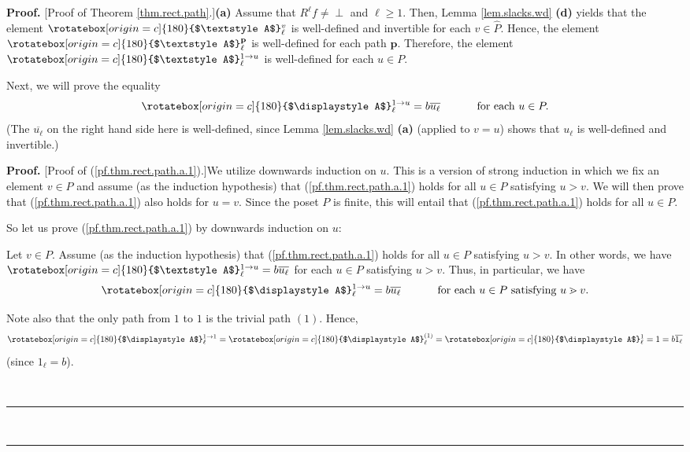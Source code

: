 \documentclass[numbers=enddot,12pt,final,onecolumn,notitlepage]{scrartcl}%
\theoremstyle{definition}
\newenvironment{verlong}{}{}
\newcommand{\undf}{\operatorname*{\bot}}
\newcommand{\upslack}{\mathchoice{\rotatebox[origin=c]{180}{$\displaystyle A$}}{\rotatebox[origin=c]{180}{$\textstyle A$}}{\rotatebox[origin=c]{180}{$\scriptstyle A$}}{\rotatebox[origin=c]{180}{$\scriptscriptstyle A$}}}
\newenvironment{proof}[1][Proof]{\noindent\textbf{#1.} }{\ \rule{0.5em}{0.5em}}
\begin{document}
\begin{proof}
[Proof of Theorem \ref{thm.rect.path}.]\textbf{(a)} Assume that $R^{\ell}%
f\neq\undf$ and $\ell\geq1$. Then, Lemma \ref{lem.slacks.wd} \textbf{(d)}
yields that the element $\upslack_{\ell}^{v}$ is well-defined and invertible
for each $v\in\widehat{P}$. Hence, the element $\upslack_{\ell}^{\mathbf{p}}$
is well-defined for each path $\mathbf{p}$. Therefore, the element
$\upslack_{\ell}^{1\rightarrow u}$ is well-defined for each $u\in P$.

Next, we will prove the equality
\begin{equation}
\upslack_{\ell}^{1\rightarrow u}=b\overline{u_{\ell}}%
\ \ \ \ \ \ \ \ \ \ \text{for each }u\in P. \label{pf.thm.rect.path.a.1}%
\end{equation}
(The $\overline{u_{\ell}}$ on the right hand side here is well-defined, since
Lemma \ref{lem.slacks.wd} \textbf{(a)} (applied to $v=u$) shows that $u_{\ell
}$ is well-defined and invertible.)

\begin{proof}
[Proof of (\ref{pf.thm.rect.path.a.1}).]We utilize downwards induction on $u$.
This is a version of strong induction in which we fix an element $v\in P$ and
assume (as the induction hypothesis) that (\ref{pf.thm.rect.path.a.1}) holds
for all $u\in P$ satisfying $u>v$. We will then prove that
(\ref{pf.thm.rect.path.a.1}) also holds for $u=v$. Since the poset $P$ is
finite, this will entail that (\ref{pf.thm.rect.path.a.1}) holds for all $u\in
P$.

\begin{verlong}
So let us prove (\ref{pf.thm.rect.path.a.1}) by downwards induction on $u$:
\end{verlong}

Let $v\in P$. Assume (as the induction hypothesis) that
(\ref{pf.thm.rect.path.a.1}) holds for all $u\in P$ satisfying $u>v$. In other
words, we have $\upslack_{\ell}^{1\rightarrow u}=b\overline{u_{\ell}}$ for
each $u\in P$ satisfying $u>v$. Thus, in particular, we have%
\begin{equation}
\upslack_{\ell}^{1\rightarrow u}=b\overline{u_{\ell}}%
\ \ \ \ \ \ \ \ \ \ \text{for each }u\in P\text{ satisfying }u\gtrdot v.
\label{pf.thm.rect.path.a.1.pf.IH2}%
\end{equation}


Note also that the only path from $1$ to $1$ is the trivial path $\left(
1\right)  $. Hence,
\begin{equation}
\upslack_{\ell}^{1\rightarrow1}=\upslack_{\ell}^{\left(  1\right)
}=\upslack_{\ell}^{1}=1=b\overline{1_{\ell}}
\label{pf.thm.rect.path.a.1.pf.IH3}%
\end{equation}
(since $1_{\ell}=b$).


\end{proof}
\end{proof}
\end{document}
